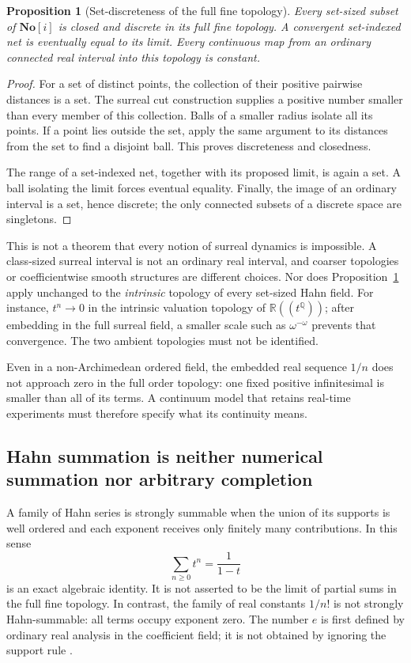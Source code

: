 \documentclass[11pt,a4paper]{article}
\numberwithin{equation}{section}
\newtheorem{proposition}[theorem]{Proposition}
\theoremstyle{definition}
\theoremstyle{remark}
\newcommand{\No}{\mathbf{No}}
\newcommand{\SC}{\No[i]}
\newcommand{\R}{\mathbb R}
\newcommand{\Q}{\mathbb Q}
\begin{document}
\begin{proposition}[Set-discreteness of the full fine topology]\label{prop:discrete}
Every set-sized subset of $\SC$ is closed and discrete in its full fine topology. A convergent set-indexed net is eventually equal to its limit. Every continuous map from an ordinary connected real interval into this topology is constant.
\end{proposition}
\begin{proof}
For a set of distinct points, the collection of their positive pairwise distances is a set. The surreal cut construction supplies a positive number smaller than every member of this collection. Balls of a smaller radius isolate all its points. If a point lies outside the set, apply the same argument to its distances from the set to find a disjoint ball. This proves discreteness and closedness.

The range of a set-indexed net, together with its proposed limit, is again a set. A ball isolating the limit forces eventual equality. Finally, the image of an ordinary interval is a set, hence discrete; the only connected subsets of a discrete space are singletons.
\end{proof}

This is not a theorem that every notion of surreal dynamics is impossible. A class-sized surreal interval is not an ordinary real interval, and coarser topologies or coefficientwise smooth structures are different choices. Nor does Proposition~\ref{prop:discrete} apply unchanged to the \emph{intrinsic} topology of every set-sized Hahn field. For instance, $t^n\to0$ in the intrinsic valuation topology of $\R((t^\Q))$; after embedding in the full surreal field, a smaller scale such as $\omega^{-\omega}$ prevents that convergence. The two ambient topologies must not be identified.

Even in a non-Archimedean ordered field, the embedded real sequence $1/n$ does not approach zero in the full order topology: one fixed positive infinitesimal is smaller than all of its terms. A continuum model that retains real-time experiments must therefore specify what its continuity means.

\subsection{Hahn summation is neither numerical summation nor arbitrary completion}
A family of Hahn series is strongly summable when the union of its supports is well ordered and each exponent receives only finitely many contributions. In this sense
\begin{equation}\label{eq:geometric}
 \sum_{n\geq0}t^n=\frac{1}{1-t}
\end{equation}
is an exact algebraic identity. It is not asserted to be the limit of partial sums in the full fine topology. In contrast, the family of real constants $1/n!$ is not strongly Hahn-summable: all terms occupy exponent zero. The number $e$ is first defined by ordinary real analysis in the coefficient field; it is not obtained by ignoring the support rule \cite{Repo,RepoAnalysis}.
\end{document}
